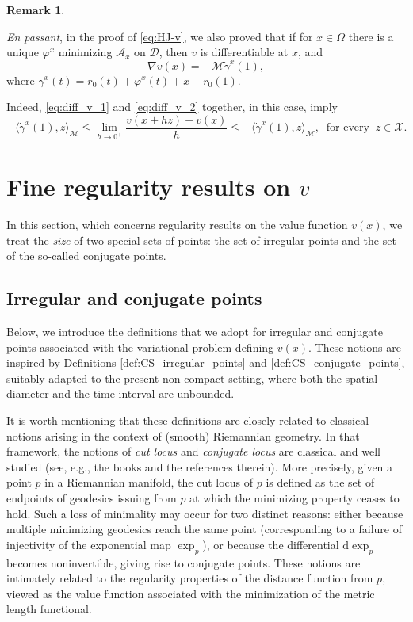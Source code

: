 \documentclass[a4paper,10pt]{amsart}
\newcommand{\ud}{\mathrm{d}}
\theoremstyle{plain}
\theoremstyle{definition}
\newtheorem{rem}[thm]{Remark}
\numberwithin{equation}{section}
\numberwithin{thm}{section}
\begin{document}
\begin{rem}
\label{rem:regular_points}
    {
\rm
\emph{En passant}, in the proof of \eqref{eq:HJ-v}, we also proved that if for $x \in \Omega$ there is a unique $\varphi^x$ minimizing $\mathcal{A}_x$ on $\mathcal D$, then $v$ is differentiable at $x$, and 
\[
\nabla v(x)=-\mathcal{M}\dot \gamma^x(1),
\]
where $\gamma^x(t)=r_0(t)+\varphi^x(t)+x-r_0(1)$. 

Indeed, \eqref{eq:diff_v_1} and \eqref{eq:diff_v_2} together, in this case, imply
\[
-\langle \dot \gamma^x(1), z\rangle_\mathcal{M} \le \lim_{h\to0^+}\frac{v(x+hz)-v(x)}{h} \le -\langle \dot \gamma^x(1),z\rangle_\mathcal{M}, \ \mbox{ for every } \ z \in \mathcal{X}.
\]
    }
\end{rem}

\section{Fine regularity results on $v$}

In this section, which concerns regularity results on the value function $v(x)$, we treat the \emph{size} of two special sets of points: the set of irregular points and the set of the so-called conjugate points.

\subsection{Irregular and conjugate points}\label{reg_irregular}


Below, we introduce the definitions that we adopt for irregular and conjugate points associated with the variational problem defining $v(x)$. These notions are inspired by Definitions \ref{def:CS_irregular_points} and \ref{def:CS_conjugate_points}, suitably adapted to the present non-compact setting, where both the spatial diameter and the time interval are unbounded.

It is worth mentioning that these definitions are closely related to classical notions arising in the context of (smooth) Riemannian geometry. In that framework, the notions of {\em cut locus} and {\em conjugate locus} are classical and well studied (see, e.g., the books \cite{Bergerbook, Gallot_etal} and the references therein). More precisely, given a point $p$ in a Riemannian manifold, the cut locus of $p$ is defined as the set of endpoints of geodesics issuing from $p$ at which the minimizing property ceases to hold. Such a loss of minimality may occur for two distinct reasons: either because multiple minimizing geodesics reach the same point (corresponding to a failure of injectivity of the exponential map $\exp_p$), or because the differential $\ud\exp_p$ becomes noninvertible, giving rise to conjugate points. These notions are intimately related to the regularity properties of the distance function from $p$, viewed as the value function associated with the minimization of the metric length functional.
\end{document}

